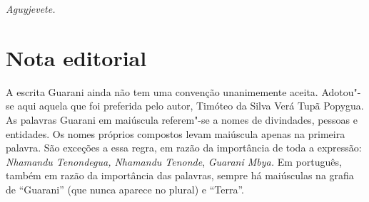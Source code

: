 \medskip{} 

\hfill \emph{Aguyjevete.}

 

 

\section{Nota editorial}

A escrita Guarani ainda não tem uma convenção unanimemente aceita.
Adotou"-se aqui aquela que foi preferida pelo autor, Timóteo da Silva
Verá Tupã Popygua. As palavras Guarani em maiúscula referem"-se a nomes
de divindades, pessoas e entidades. Os nomes próprios compostos levam
maiúscula apenas na primeira palavra. São exceções a essa regra, em
razão da importância de toda a expressão: \emph{Nhamandu Tenondegua,
Nhamandu Tenonde}, \emph{Guarani Mbya.} Em português, também em razão da
importância das palavras, sempre há maiúsculas na grafia de ``Guarani''
(que nunca aparece no plural) e ``Terra''.
